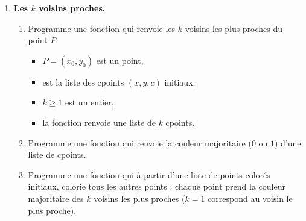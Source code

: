 \documentclass[11pt,class=report,crop=false]{standalone}
\begin{document}
\begin{activite}
\begin{enumerate}
	\item \textbf{Les $k$ voisins proches.}
	\begin{enumerate}
		\item Programme une fonction 
		qui renvoie les $k$ voisins les plus proches du point $P$.
		\begin{itemize}
			\item $P=(x_0,y_0)$ est un point,
			\item {} est la liste des cpoints $(x,y,c)$ initiaux,
			\item $k\ge1$ est un entier,
			\item la fonction renvoie une liste de $k$ cpoints.
		\end{itemize}  
		 
		\item Programme une fonction  qui renvoie la couleur majoritaire ($0$ ou $1$) d'une liste de cpoints.
		
		\item Programme une fonction  
		qui à partir d'une liste de points colorés initiaux, colorie tous les autres points : chaque point prend la couleur majoritaire des $k$ voisins les plus proches ($k=1$ correspond au voisin le plus proche).
		

\end{enumerate}
\end{enumerate}
\end{activite}
\end{document}
